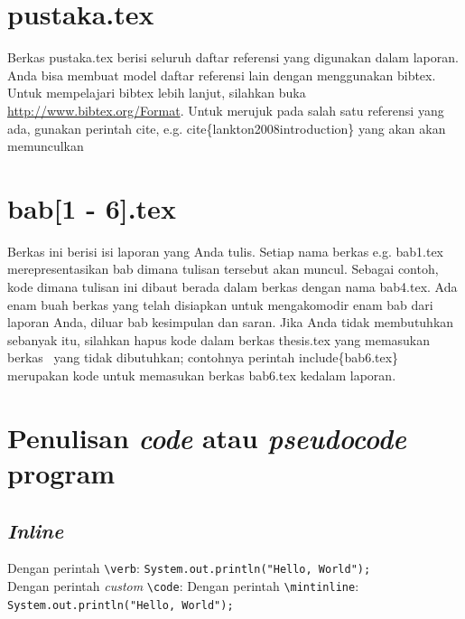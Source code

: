     \section{pustaka.tex}
    Berkas pustaka.tex berisi seluruh daftar referensi yang digunakan dalam
    laporan.
    Anda bisa membuat model daftar referensi lain dengan menggunakan bibtex.
    Untuk mempelajari bibtex lebih lanjut, silahkan buka
    \url{http://www.bibtex.org/Format}.
    Untuk merujuk pada salah satu referensi yang ada, gunakan perintah \bslash
    cite, e.g. \bslash cite\{lankton2008introduction\} yang akan akan memunculkan
    \cite{lankton2008introduction}


    \section{bab[1 - 6].tex}
    Berkas ini berisi isi laporan yang Anda tulis.
    Setiap nama berkas e.g. bab1.tex merepresentasikan bab dimana tulisan tersebut
    akan muncul.
    Sebagai contoh, kode dimana tulisan ini dibaut berada dalam berkas dengan nama
    bab4.tex.
    Ada enam buah berkas yang telah disiapkan untuk mengakomodir enam bab dari
    laporan Anda, diluar bab kesimpulan dan saran.
    Jika Anda tidak membutuhkan sebanyak itu, silahkan hapus kode dalam berkas
    thesis.tex yang memasukan berkas \latex~yang tidak dibutuhkan;  contohnya
    perintah \bslash include\{bab6.tex\} merupakan kode untuk memasukan berkas
    bab6.tex kedalam laporan.

    \section{Penulisan \textit{code} atau \textit{pseudocode} program}

    \subsection{\textit{Inline}}

    Dengan perintah \verb|\verb|: \verb|System.out.println("Hello, World");| \\
    Dengan perintah \textit{custom} \verb|\code|: 
    Dengan perintah \verb|\mintinline|: \texttt{System.out.println("Hello, World"); }

